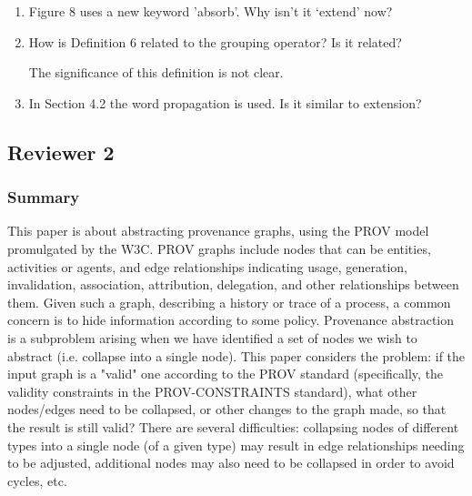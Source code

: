 \documentclass{article}
\newcommand{\showComments}{yes} %
\newcommand{\com}[2]{\ifthenelse{\equal{\showComments}{yes}}{\textcolor{#1}{#2}}{}}
\newcommand{\comment}[1]{\com{red}{#1}}
\begin{document}
\begin{enumerate}
\item Figure 8 uses a new keyword ’absorb’. Why isn’t it ‘extend’ now?

\comment{Historical reasons! JWB to fix.}   

\item How is Definition 6 related to the grouping operator? Is it related?

The significance of this definition is not clear. 

  \comment{Let's remove defn 6. JWB to do.}

\item In Section 4.2 the word propagation is used. Is it similar to extension? 

  \comment{Similar. Perhaps avoid the word.  I think the first reviewer just gave up here. JWB to correct.} 

  
\end{enumerate}

\subsection*{Reviewer 2}

   \subsubsection*{Summary}

This paper is about abstracting provenance graphs, using the PROV model promulgated by the W3C.  PROV graphs include nodes that can be entities, activities or agents, and edge relationships indicating usage, generation, invalidation, association, attribution, delegation, and other relationships between them.  Given such a graph, describing a history or trace of a process, a common concern is to hide information according to some policy.  Provenance abstraction is a subproblem arising when we have identified a set of nodes we wish to abstract (i.e. collapse into a single node).  This paper considers the problem: if the input graph is a "valid" one according to the PROV standard (specifically, the validity constraints in the PROV-CONSTRAINTS standard), what other nodes/edges need to be collapsed, or other changes to the graph made, so that the result is still valid?  There are several difficulties: collapsing nodes of different types into a single node (of a given type) may result in edge relationships needing to be adjusted,  additional nodes may also need to be collapsed in order to avoid cycles, etc.
\end{document}

